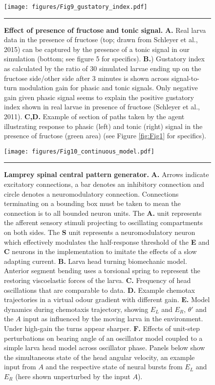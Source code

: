 \documentclass[10pt,a4paper]{article}
\begin{document}
\begin{figure}[!ht]
\begin{center}
\texttt{[image: figures/Fig9\_gustatory\_index.pdf]}
\caption{{\bf Effect of presence of fructose and tonic signal.}
{\bf A.} Real larva data in the presence of fructose (top; drawn from Schleyer et al., 2015) can be captured by the presence of a tonic signal in our simulation (bottom; see figure 5 for specifics).
{\bf B.}) Gustatory index as calculated by the ratio of 30 simulated larvae ending up on the fructose side/other side after 3 minutes is shown across signal-to-turn modulation gain for phasic and tonic signals. Only negative gain given phasic signal seems to explain the positive gustatory index shown in real larvae in presence of fructose (Schleyer et al., 2011).
{\bf C,D.} Example of section of paths taken by the agent illustrating response to phasic (left) and tonic (right) signal in the presence of fructose (green area) (see Figure \ref{fig:Fig1} for specifics).
\label{fig:Fig9}}
\hrule
\end{center}
\end{figure}

\begin{figure}[!ht]
\begin{center}
\texttt{[image: figures/Fig10\_continuous\_model.pdf]}
\caption{{\bf Lamprey spinal central pattern generator.} {\bf A.} Arrows indicate excitatory connections, a bar denotes an inhibitory connection and circle denotes a neuromodulatory connection. Connections terminating on a bounding box must be taken to mean the connection is to all bounded neuron units. The {\bf A.} unit represents the afferent sensory stimuli projecting to oscillating compartments on both sides. The {\bf S} unit represents a neuromodulatory neuron which effectively modulates the half-response threshold of the {\bf E} and {\bf C} neurons in the \cite{wilson1999spikes} implementation to imitate the effects of a slow adapting current.
{\bf B.} Larva head turning biomechanic model. Anterior segment bending uses a torsional spring to represent the restoring viscoelastic forces of the larva.
{\bf C.} Frequency of head oscillations that are comparable to data.
{\bf D.} Example chemotax trajectories in a virtual odour gradient with different gain.
{\bf E.} Model dynamics during chemotaxis trajectory, showing $E_L$ and  $E_R$, $\theta'$ and the $A$ input as influenced by the moving larva in the environment. Under high-gain the turns appear sharper.
{\bf F.} Effects of unit-step perturbations on bearing angle of an oscillator model coupled to a simple larva head model across oscillator phase. Panels below show the simultaneous state of the head angular velocity, an example input from $A$ and the respective state of neural bursts from $E_L$ and $E_R$ (here shown unperturbed by the input $A$).
\label{fig:LampreyModel}}
\hrule
\end{center}
\end{figure}
\end{document}

